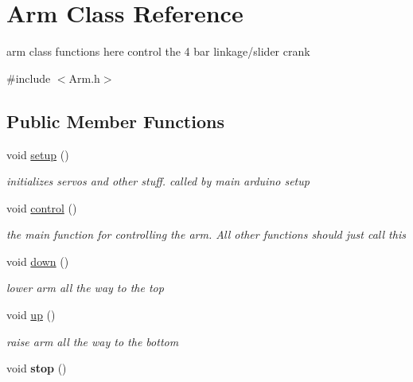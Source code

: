 \hypertarget{classArm}{\section{Arm Class Reference}
\label{classArm}
}


arm class functions here control the 4 bar linkage/slider crank  




{\ttfamily \#include $<$Arm.\-h$>$}

\subsection*{Public Member Functions}
\begin{DoxyCompactItemize}
\item 
\hypertarget{classArm_a0e642e1a6fc24f40268f2c759dee62e1}{void \hyperlink{classArm_a0e642e1a6fc24f40268f2c759dee62e1}{setup} ()}\label{classArm_a0e642e1a6fc24f40268f2c759dee62e1}

\begin{DoxyCompactList}\small\item\em initializes servos and other stuff. called by main arduino setup \end{DoxyCompactList}\item 
\hypertarget{classArm_a009c19e5b213f692c24eab792cc40c47}{void \hyperlink{classArm_a009c19e5b213f692c24eab792cc40c47}{control} ()}\label{classArm_a009c19e5b213f692c24eab792cc40c47}

\begin{DoxyCompactList}\small\item\em the main function for controlling the arm. All other functions should just call this \end{DoxyCompactList}\item 
\hypertarget{classArm_a9075166ca53ef3cd547a7725ee5bca1d}{void \hyperlink{classArm_a9075166ca53ef3cd547a7725ee5bca1d}{down} ()}\label{classArm_a9075166ca53ef3cd547a7725ee5bca1d}

\begin{DoxyCompactList}\small\item\em lower arm all the way to the top \end{DoxyCompactList}\item 
\hypertarget{classArm_a65ffd463407a6782a55dbd5b84f1e15e}{void \hyperlink{classArm_a65ffd463407a6782a55dbd5b84f1e15e}{up} ()}\label{classArm_a65ffd463407a6782a55dbd5b84f1e15e}

\begin{DoxyCompactList}\small\item\em raise arm all the way to the bottom \end{DoxyCompactList}\item 
\hypertarget{classArm_a4a8274680d981524efbeb2b51eb49c28}{void {\bfseries stop} ()}\label{classArm_a4a8274680d981524efbeb2b51eb49c28}


\end{DoxyCompactItemize}
